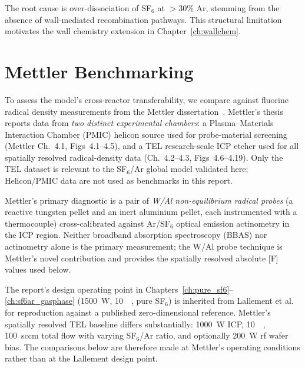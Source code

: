 \documentclass[11pt,a4paper]{report}
\begin{document}
The root cause is over-dissociation of SF$_6$ at $>30\%$ Ar, stemming from the absence of wall-mediated recombination pathways.  This structural limitation motivates the wall chemistry extension in Chapter~\ref{ch:wallchem}.

\section{Mettler Benchmarking}
\label{sec:gasphase_mettler}

To assess the model's cross-reactor transferability, we compare against fluorine radical density measurements from the Mettler dissertation~\cite{Mettler2025}.  Mettler's thesis reports data from \emph{two distinct experimental chambers}: a Plasma--Materials Interaction Chamber (PMIC) helicon source used for probe-material screening (Mettler Ch.~4.1, Figs~4.1--4.5), and a TEL research-scale ICP etcher used for all spatially resolved radical-density data (Ch.~4.2--4.3, Figs~4.6--4.19).  Only the TEL dataset is relevant to the SF$_6$/Ar global model validated here; Helicon/PMIC data are not used as benchmarks in this report.

Mettler's primary diagnostic is a pair of \emph{W/Al non-equilibrium radical probes} (a reactive tungsten pellet and an inert aluminium pellet, each instrumented with a thermocouple) cross-calibrated against Ar/SF$_6$ optical emission actinometry in the ICP region.  Neither broadband absorption spectroscopy (BBAS) nor actinometry alone is the primary measurement; the W/Al probe technique is Mettler's novel contribution and provides the spatially resolved absolute [F] values used below.

The report's design operating point in Chapters~\ref{ch:pure_sf6}--\ref{ch:sf6ar_gasphase} (\SI{1500}{\watt}, \SI{10}{\milli\torr}, pure SF$_6$) is inherited from Lallement et al.~\cite{Lallement2009} for reproduction against a published zero-dimensional reference.  Mettler's spatially resolved TEL baseline differs substantially: \SI{1000}{\watt} ICP, \SI{10}{\milli\torr}, \SI{100}{sccm} total flow with varying SF$_6$/Ar ratio, and optionally \SI{200}{\watt} rf wafer bias.  The comparisons below are therefore made at Mettler's operating conditions rather than at the Lallement design point.
\end{document}

